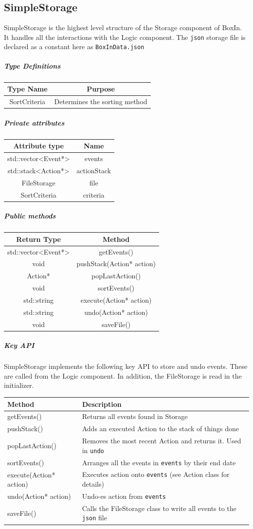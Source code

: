 \documentclass[12pt]{extarticle}
\begin{document}
\subsection{SimpleStorage}
SimpleStorage is the highest level structure of the Storage component of BoxIn. It handles all the interactions with the Logic component. The \texttt{json} storage file is declared as a constant here as \texttt{BoxInData.json}
\subparagraph{Type Definitions}
\begin{tabular}{c c}
Type Name & Purpose\\
\hline
SortCriteria & Determines the sorting method\\
\end{tabular}
\subparagraph{Private attributes}
\begin{tabular}{c c}
Attribute type & Name\\
\hline
std::vector<Event*> & events\\
std::stack<Action*> & actionStack\\
FileStorage & file\\
SortCriteria & criteria \\
\end{tabular}
\subparagraph{Public methods}
\begin{tabular}{c c}
Return Type & Method\\
\hline
std::vector<Event*> & getEvents()\\
void & pushStack(Action* action)\\
Action* & popLastAction()\\
void & sortEvents()\\
std::string & execute(Action* action)\\
std::string & undo(Action* action)\\
void & saveFile()\\
\end{tabular}
\subparagraph{Key API}
SimpleStorage implements the following key API to store and undo events. These are called from the Logic component. In addition, the FileStorage is read in the initializer.\\
\begin{tabular}{p{6cm} p{12cm}}
Method & Description\\
\hline
getEvents() & Returns all events found in Storage\\
pushStack() & Adds an executed Action to the stack of things done\\
popLastAction() & Removes the most recent Action and returns it. Used in \texttt{undo}\\
sortEvents() & Arranges all the events in \texttt{events} by their end date\\
execute(Action* action) & Executes action onto \texttt{events} (see Action class for details)\\ 
undo(Action* action) & Undo-es action from \texttt{events}\\
saveFile() & Calls the FileStorage class to write all events to the \texttt{json} file\\
\end{tabular}
\end{document}
